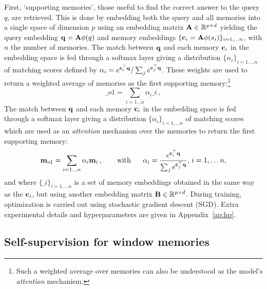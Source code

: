 First, `supporting memories', those useful to find the correct answer to the query $q$, are retrieved. This is done by embedding both the query and all memories into a single space of dimension $p$ using an embedding matrix ${\bf A}\in\mathbb{R}^{p \times d}$ yielding the query embedding  ${\bf q}={\bf A}\phi(q)$ and memory embeddings $\{{\bf c}_i={\bf A}\phi(s_i)\}_{i=1,\dots n}$, with $n$ the number of memories. %
%
The match between ${\bf q}$ and each memory ${\bf c}_i$ in the embedding space is fed through a softmax layer giving a distribution \(\{\alpha_i\}_{i=1, \dots n}\) of matching scores defined by $\alpha_i =  e^{{\bf c}_i^\top{\bf q}} / \sum_j e^{{\bf c}_j^\top{\bf q}}$. These weights are used to return a weighted average of memories as the first supporting memory:\footnote{Such a weighted average over memories can also be understood as the model's \emph{attention} mechanism.} 
\begin{equation} \label{eq:eq_o}
  \bm_{o1} = \sum_{i=1 \dots n} \alpha_{i} \bm_i \,,
\end{equation}
\fi
The match between ${\bf q}$ and each memory ${\bf c}_i$ in the embedding space is fed through a softmax layer giving a distribution \(\{\alpha_i\}_{i=1, \dots n}\) of matching scores which are used as an \emph{attention} mechanism over the memories to return the first supporting memory:%
\begin{equation} \label{eq:eq_o}
  {\bf m}_{o1} = \sum_{i=1 \dots n} \alpha_{i} {\bf m}_i\,, \mbox{~~~~~~}\text{with~~~~~}\alpha_i =  \frac{e^{{\bf c}_i^\top{\bf q}}}{\sum_j e^{{\bf c}_j^\top{\bf q}}}, \, i=1,\dots n,
\end{equation}
and where $\{\bm_i\}_{i=1,\dots n}$ is a set of memory embeddings obtained in the same way as the ${\bf c}_i$, but using another embedding matrix ${\bf B}\in\mathbb{R}^{p\times d}$. During training, optimization is carried out using stochastic gradient descent (SGD). Extra experimental details and hyperparameters are given in Appendix~\ref{ap:hp}.



\subsection{Self-supervision for window memories} \label{sec:ssup}

